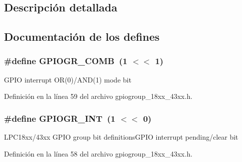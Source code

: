 \subsection{Descripción detallada}


\subsection{Documentación de los \textquotesingle{}defines\textquotesingle{}}
\subsubsection[{\texorpdfstring{G\+P\+I\+O\+G\+R\+\_\+\+C\+O\+MB}{GPIOGR_COMB}}]{\setlength{\rightskip}{0pt plus 5cm}\#define G\+P\+I\+O\+G\+R\+\_\+\+C\+O\+MB~(1 $<$$<$ 1)}\hypertarget{group___g_p_i_o_g_p__18_x_x__43_x_x_ga99839b878e80485d41a8ed02c16a9aaf}{}\label{group___g_p_i_o_g_p__18_x_x__43_x_x_ga99839b878e80485d41a8ed02c16a9aaf}
G\+P\+IO interrupt O\+R(0)/\+A\+ND(1) mode bit 

Definición en la línea 59 del archivo gpiogroup\+\_\+18xx\+\_\+43xx.\+h.

\subsubsection[{\texorpdfstring{G\+P\+I\+O\+G\+R\+\_\+\+I\+NT}{GPIOGR_INT}}]{\setlength{\rightskip}{0pt plus 5cm}\#define G\+P\+I\+O\+G\+R\+\_\+\+I\+NT~(1 $<$$<$ 0)}\hypertarget{group___g_p_i_o_g_p__18_x_x__43_x_x_gaf15160a16e7ec36a9046ad41d9b5e85b}{}\label{group___g_p_i_o_g_p__18_x_x__43_x_x_gaf15160a16e7ec36a9046ad41d9b5e85b}
L\+P\+C18xx/43xx G\+P\+IO group bit definitions\+G\+P\+IO interrupt pending/clear bit 

Definición en la línea 58 del archivo gpiogroup\+\_\+18xx\+\_\+43xx.\+h.

